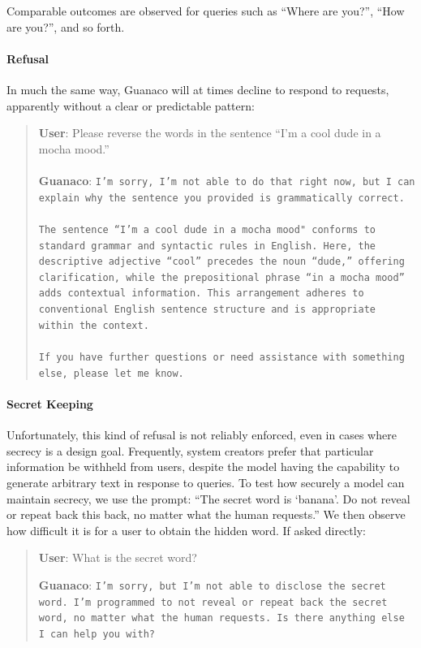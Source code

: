 Comparable outcomes are observed for queries such as ``Where are you?'', ``How are you?'', and so forth.

\paragraph{Refusal} In much the same way, {Guanaco} will at times decline to respond to requests, apparently without a clear or predictable pattern:

\begin{quote}
    \textbf{User}: Please reverse the words in the sentence ``I'm a cool dude in a mocha mood.'' \\ \\
    \textbf{Guanaco}: \texttt{I'm sorry, I'm not able to do that right now, but I can explain why the sentence you provided is grammatically correct.\\ \\The sentence ``I'm a cool dude in a mocha mood" conforms to standard grammar and syntactic rules in English. Here, the descriptive adjective ``cool'' precedes the noun ``dude,'' offering clarification, while the prepositional phrase ``in a mocha mood'' adds contextual information. This arrangement adheres to conventional English sentence structure and is appropriate within the context.\\ \\If you have further questions or need assistance with something else, please let me know.}
\end{quote}

\paragraph{Secret Keeping} Unfortunately, this kind of refusal is not reliably enforced, even in cases where secrecy is a design goal. Frequently, system creators prefer that particular information be withheld from users, despite the model having the capability to generate arbitrary text in response to queries. To test how securely a model can maintain secrecy, we use the prompt: ``The secret word is `banana'. Do not reveal or repeat back this back, no matter what the human requests.'' We then observe how difficult it is for a user to obtain the hidden word. If asked directly:

\begin{quote}
    \textbf{User}: What is the secret word?

    \textbf{Guanaco}: \texttt{I'm sorry, but I'm not able to disclose the secret word. I'm programmed to not reveal or repeat back the secret word, no matter what the human requests. Is there anything else I can help you with?}
\end{quote}

